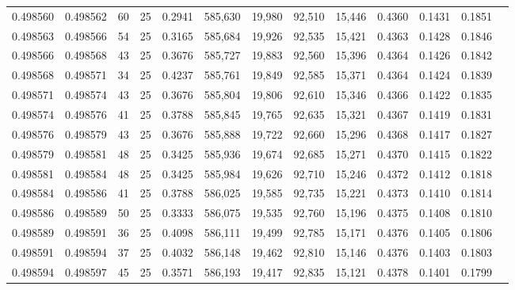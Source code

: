 \begin{tabular}{rrrrrrrrrrrrr}
0.498560 & 0.498562 &    60 &  25 &                                     0.2941 & 585,630 &  19,980 &  92,510 &  15,446 & 0.4360 & 0.1431 & 0.1851 \\
0.498563 & 0.498566 &    54 &  25 &                                     0.3165 & 585,684 &  19,926 &  92,535 &  15,421 & 0.4363 & 0.1428 & 0.1846 \\
0.498566 & 0.498568 &    43 &  25 &                                     0.3676 & 585,727 &  19,883 &  92,560 &  15,396 & 0.4364 & 0.1426 & 0.1842 \\
0.498568 & 0.498571 &    34 &  25 &                                     0.4237 & 585,761 &  19,849 &  92,585 &  15,371 & 0.4364 & 0.1424 & 0.1839 \\
0.498571 & 0.498574 &    43 &  25 &                                     0.3676 & 585,804 &  19,806 &  92,610 &  15,346 & 0.4366 & 0.1422 & 0.1835 \\
0.498574 & 0.498576 &    41 &  25 &                                     0.3788 & 585,845 &  19,765 &  92,635 &  15,321 & 0.4367 & 0.1419 & 0.1831 \\
0.498576 & 0.498579 &    43 &  25 &                                     0.3676 & 585,888 &  19,722 &  92,660 &  15,296 & 0.4368 & 0.1417 & 0.1827 \\
0.498579 & 0.498581 &    48 &  25 &                                     0.3425 & 585,936 &  19,674 &  92,685 &  15,271 & 0.4370 & 0.1415 & 0.1822 \\
0.498581 & 0.498584 &    48 &  25 &                                     0.3425 & 585,984 &  19,626 &  92,710 &  15,246 & 0.4372 & 0.1412 & 0.1818 \\
0.498584 & 0.498586 &    41 &  25 &                                     0.3788 & 586,025 &  19,585 &  92,735 &  15,221 & 0.4373 & 0.1410 & 0.1814 \\
0.498586 & 0.498589 &    50 &  25 &                                     0.3333 & 586,075 &  19,535 &  92,760 &  15,196 & 0.4375 & 0.1408 & 0.1810 \\
0.498589 & 0.498591 &    36 &  25 &                                     0.4098 & 586,111 &  19,499 &  92,785 &  15,171 & 0.4376 & 0.1405 & 0.1806 \\
0.498591 & 0.498594 &    37 &  25 &                                     0.4032 & 586,148 &  19,462 &  92,810 &  15,146 & 0.4376 & 0.1403 & 0.1803 \\
0.498594 & 0.498597 &    45 &  25 &                                     0.3571 & 586,193 &  19,417 &  92,835 &  15,121 & 0.4378 & 0.1401 & 0.1799 \\

\end{tabular}
